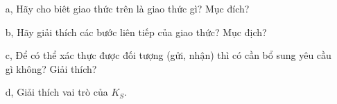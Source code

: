 \documentclass[paper=a4, fontsize=11pt]{scrartcl}
\numberwithin{equation}{section}		%
\numberwithin{figure}{section}			%
\numberwithin{table}{section}				%
\begin{document}
	\begin{itemize}
		\item[a,] Hãy cho biêt giao thức trên là giao thức gì? Mục đích?
		\item[b,] Hãy giải thích các bước liên tiếp của giao thức? Mục địch?
		\item[c,] Để có thể xác thực được đối tượng (gửi, nhận) thì có cần bổ sung yêu cầu gì không? Giải thích?
		\item[d,] Giải thích vai trò của $K_S$.
	\end{itemize}
\end{document}
